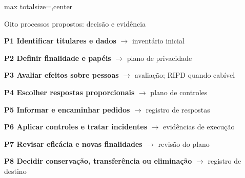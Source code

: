 \documentclass[12pt]{article}
\begin{document}
\begin{adjustbox}{max totalsize={\textwidth}{\textheight},center}
{%
\begin{caixa}{Oito processos propostos: decisão e evidência}
\fontsize{12.5}{16}\selectfont\raggedright
\begin{minipage}[t]{0.48\linewidth}\vspace{0pt}
\textbf{P1 Identificar titulares e dados} $\rightarrow$ inventário inicial\par\smallskip
\textbf{P2 Definir finalidade e papéis} $\rightarrow$ plano de privacidade\par\smallskip
\textbf{P3 Avaliar efeitos sobre pessoas} $\rightarrow$ avaliação; RIPD quando cabível\par\smallskip
\textbf{P4 Escolher respostas proporcionais} $\rightarrow$ plano de controles
\end{minipage}\hfill
\begin{minipage}[t]{0.48\linewidth}\vspace{0pt}
\textbf{P5 Informar e encaminhar pedidos} $\rightarrow$ registro de respostas\par\smallskip
\textbf{P6 Aplicar controles e tratar incidentes} $\rightarrow$ evidências de execução\par\smallskip
\textbf{P7 Revisar eficácia e novas finalidades} $\rightarrow$ revisão do plano\par\smallskip
\textbf{P8 Decidir conservação, transferência ou eliminação} $\rightarrow$ registro de destino
\end{minipage}
\end{caixa}

\vspace{5mm}

}
\end{adjustbox}
\end{document}
